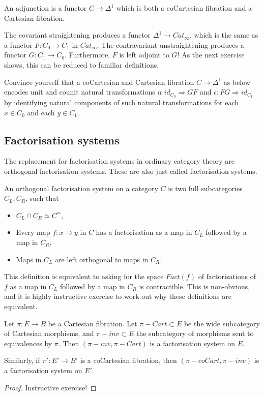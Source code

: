 An adjunction is a functor $C\rightarrow \Delta^1$ which is both a coCartesian fibration and a Cartesian fibration.

The covariant straightening produces a functor $\Delta^1\rightarrow Cat_\infty$, which is the same as a functor $F:C_0\rightarrow C_1$ in $Cat_\infty$. The contravariant unstraightening produces a functor $G:C_1\rightarrow C_0$. Furthermore, $F$ is left adjoint to $G$! As the next exercise shows, this can be reduced to familiar definitions.

\begin{exercise}
    Convince yourself that a coCartesian and Cartesian fibration $C\rightarrow \Delta^1$ as below encodes unit and counit natural transformations $\eta:id_{C_0}\Rightarrow GF$ and $\epsilon: FG\Rightarrow id_{C_1}$ by identifying natural components of such natural transformations for each $x\in C_0$ and each $y\in C_1$.
\end{exercise}


\subsection{Factorisation systems}
The replacement for factorisation systems in ordinary category theory are orthogonal factorisation systems. These are also just called factorisation systems.

\begin{definition}
    An orthogonal factorisation system on a category $C$ is two full subcategories $C_L,C_R$, such that 
    \begin{itemize}
        \item $C_L\cap C_R\simeq C^\simeq$,
        \item Every map $f:x\rightarrow y$ in $C$ has a factorisation as a map in $C_L$ followed by a map in $C_R$,
        \item Maps in $C_L$ are left orthogonal to maps in $C_R$.
    \end{itemize}
\end{definition}

This definition is equivalent to asking for the space $Fact(f)$ of factorisations of $f$ as a map in $C_L$ followed by a map in $C_R$ is contractible. This is non-obvious, and it is highly instructive exercise to work out why these definitions are equivalent.

\begin{proposition}
    Let $\pi:E\rightarrow B$ be a Cartesian fibration. Let $\pi-Cart\subset E$ be the wide subcategory of Cartesian morphisms, and $\pi-inv\subset E$ the subcategory of morphisms sent to equivalences by $\pi.$ Then $(\pi-inv,\pi-Cart)$ is a factorisation system on $E$.

    Similarly, if $\pi':E'\rightarrow B'$ is a coCartesian fibration, then $(\pi-coCart,\pi-inv)$ is a factorisation system on $E'$.
\end{proposition}
\begin{proof}
    Instructive exercise!
\end{proof}

